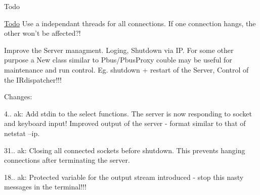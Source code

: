 \begin{DoxyRefDesc}{Todo}
\item[\hyperlink{todo__todo000009}{Todo}]Use a independant threads for all connections. If one connection hangs, the other won't be affected?! 

Improve the Server managment. Loging, Shutdown via I\-P. For some other purpose a New class similar to Pbus/\-Pbus\-Proxy couble may be useful for maintenance and run control. Eg. shutdown + restart of the Server, Control of the I\-Rdispatcher!!!\end{DoxyRefDesc}


Changes\-: \begin{DoxyItemize}
\item 4.. ak\-: Add stdin to the select functions. The server is now responding to socket and keyboard input! Improved output of the server -\/ format similar to that of netstat --ip. \item 31.. ak\-: Closing all connected sockets before shutdown. This prevents hanging connections after terminating the server. \item 18.. ak\-: Protected variable for the output stream introduced -\/ stop this nasty messages in the terminal!!! \end{DoxyItemize}


